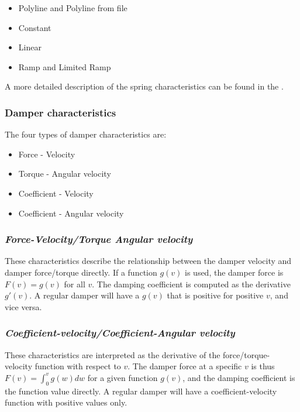 \begin{itemize}
\item Polyline and Polyline from file
\item Constant
\item Linear
\item Ramp and Limited Ramp
\end{itemize}

A more detailed description of the spring characteristics can be found in the
.

\subsubsection{Damper characteristics}

The four types of damper characteristics are:

\begin{itemize}
\item Force - Velocity
\item Torque - Angular velocity
\item Coefficient - Velocity
\item Coefficient - Angular velocity
\end{itemize}

\subsubsection{\sl\textbf{Force-Velocity/Torque Angular velocity}}

These characteristics describe the relationship between the damper velocity
and damper force/torque directly.
If a function $g(v)$ is used, the damper force is $F(v)=g(v)$ for all $v$.
The damping coefficient is computed as the derivative $g'(v)$.
A regular damper will have a $g(v)$ that is positive for positive $v$,
and vice versa.

\subsubsection{\sl\textbf{Coefficient-velocity/Coefficient-Angular velocity}}

These characteristics are interpreted as the derivative of the force/torque-
velocity function with respect to $v$. The damper force at a specific $v$ is
thus $F(v)=\int_0^vg(w)dw$ for a given function $g(v)$,
and the damping coefficient is the function value directly. A regular damper
will have a coefficient-velocity function with positive values only.

